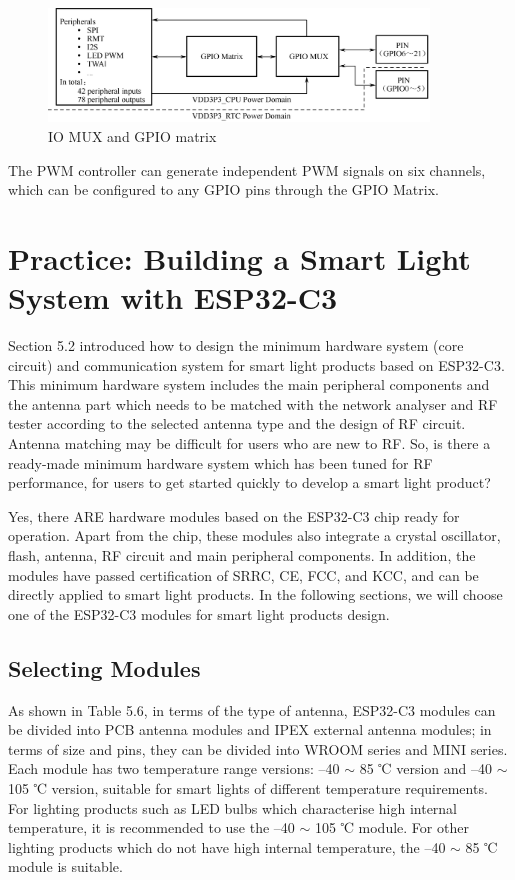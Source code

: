 \documentclass[a4paper,12pt,openany]{book}
\begin{document}
\begin{figure}[h!]
    \centering
    \includegraphics[width=0.9\textwidth]{D5Z/5-14}
    \caption{IO MUX and GPIO matrix}
\end{figure}

The PWM controller can generate independent PWM signals on six channels, which can be configured to any GPIO pins through the GPIO Matrix.

\section{Practice: Building a Smart Light System with ESP32-C3}
Section 5.2 introduced how to design the minimum hardware system (core circuit) and communication system for smart light products based on ESP32-C3. This minimum hardware system includes the main peripheral components and the antenna part which needs to be matched with the network analyser and RF tester according to the selected antenna type and the design of RF circuit. Antenna matching may be difficult for users who are new to RF. So, is there a ready-made minimum hardware system which has been tuned for RF performance, for users to get started quickly to develop a smart light product?

Yes, there ARE hardware modules based on the ESP32-C3 chip ready for operation. Apart from the chip, these modules also integrate a crystal oscillator, flash, antenna, RF circuit and main peripheral components. In addition, the modules have passed certification of SRRC, CE, FCC, and KCC, and can be directly applied to smart light products. In the following sections, we will choose one of the ESP32-C3 modules for smart light products design.

\subsection{Selecting Modules}
As shown in Table 5.6, in terms of the type of antenna, ESP32-C3 modules can be divided into PCB antenna modules and IPEX external antenna modules; in terms of size and pins, they can be divided into WROOM series and MINI series. Each module has two temperature range versions: --40 $\sim$ 85 ℃ version and --40 $\sim$ 105 ℃ version, suitable for smart lights of different temperature requirements. For lighting products such as LED bulbs which characterise high internal temperature, it is recommended to use the --40 $\sim$ 105 ℃ module. For other lighting products which do not have high internal temperature, the --40 $\sim$ 85 ℃ module is suitable.
\end{document}
